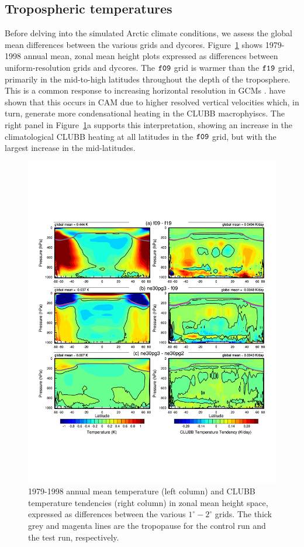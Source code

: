 \documentclass[draft]{agujournal2019}
\begin{document}
\subsection{Tropospheric temperatures}

Before delving into the simulated Arctic climate conditions, we assess the global mean differences between the various grids and dycores. Figure~\ref{fig:dT-lores} shows 1979-1998 annual mean, zonal mean height plots expressed as differences between uniform-resolution grids and dycores. The $\tt f09$ grid is warmer than the $\tt f19$ grid, primarily in the mid-to-high latitudes throughout the depth of the troposphere. This is a common response to increasing horizontal resolution in GCMs \cite{PS2002CD,RETAL2006JC}.
 have shown that this occurs in CAM due to higher resolved vertical velocities which, in turn, generate more condensational heating in the CLUBB macrophyiscs. The right panel in Figure~\ref{fig:dT-lores}a supports this interpretation, showing an increase in the climatological CLUBB heating at all latitudes in the $\tt f09$ grid, but with the largest increase in the mid-latitudes. 

\begin{figure}[t]
\begin{center}
         \includegraphics[width=130mm]{figs/temp_dhgt_panel_STEND_CLUBB-lores.pdf}
\end{center}
\caption{1979-1998 annual mean temperature (left column) and CLUBB temperature tendencies (right column) in zonal mean height space, expressed as differences between the various $1^{\circ}-2^{\circ}$ grids. The thick grey and magenta lines are the tropopause for the control run and the test run, respectively.}
\label{fig:dT-lores}
\end{figure}
\end{document}
